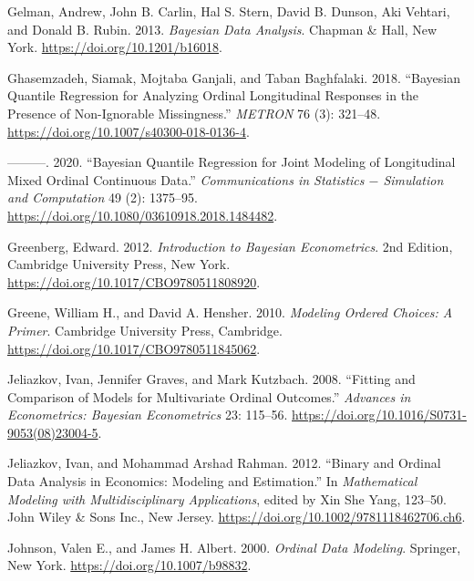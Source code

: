 \begin{CSLReferences}{1}{0}
\leavevmode{}%
Gelman, Andrew, John B. Carlin, Hal S. Stern, David B. Dunson, Aki Vehtari, and Donald B. Rubin. 2013. \emph{Bayesian Data Analysis}. Chapman \& Hall, New York. \url{https://doi.org/10.1201/b16018}.

\leavevmode{}%
Ghasemzadeh, Siamak, Mojtaba Ganjali, and Taban Baghfalaki. 2018. {``Bayesian Quantile Regression for Analyzing Ordinal Longitudinal Responses in the Presence of Non-Ignorable Missingness.''} \emph{METRON} 76 (3): 321--48. \url{https://doi.org/10.1007/s40300-018-0136-4}.

\leavevmode{}%
---------. 2020. {``Bayesian Quantile Regression for Joint Modeling of Longitudinal Mixed Ordinal Continuous Data.''} \emph{Communications in Statistics \(-\) Simulation and Computation} 49 (2): 1375--95. \url{https://doi.org/10.1080/03610918.2018.1484482}.

\leavevmode{}%
Greenberg, Edward. 2012. \emph{Introduction to {Bayesian} Econometrics}. 2nd Edition, Cambridge University Press, New York. \url{https://doi.org/10.1017/CBO9780511808920}.

\leavevmode{}%
Greene, William H., and David A. Hensher. 2010. \emph{Modeling Ordered Choices: A Primer}. Cambridge University Press, Cambridge. \url{https://doi.org/10.1017/CBO9780511845062}.

\leavevmode{}%
Jeliazkov, Ivan, Jennifer Graves, and Mark Kutzbach. 2008. {``Fitting and Comparison of Models for Multivariate Ordinal Outcomes.''} \emph{Advances in Econometrics: {Bayesian} Econometrics} 23: 115--56. \url{https://doi.org/10.1016/S0731-9053(08)23004-5}.

\leavevmode{}%
Jeliazkov, Ivan, and Mohammad Arshad Rahman. 2012. {``Binary and Ordinal Data Analysis in Economics: Modeling and Estimation.''} In \emph{Mathematical Modeling with Multidisciplinary Applications}, edited by Xin She Yang, 123--50. John Wiley \& Sons Inc., New Jersey. \url{https://doi.org/10.1002/9781118462706.ch6}.

\leavevmode{}%
Johnson, Valen E., and James H. Albert. 2000. \emph{Ordinal Data Modeling}. Springer, New York. \url{https://doi.org/10.1007/b98832}.


\end{CSLReferences}
